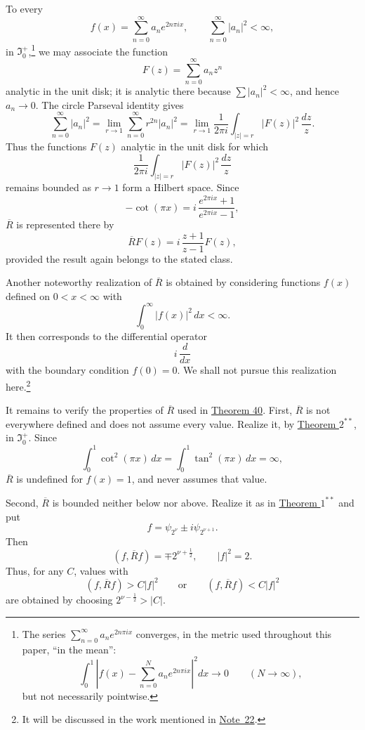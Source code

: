 ﻿\documentclass[paper=b5,fontsize=13pt,bookmarkpackage=false,twoside]{scrartcl}
\newcounter{translatornote}
\begin{document}
To every
\[
  f(x)=\sum_{n=0}^{\infty}a_ne^{2n\pi ix},
  \qquad
  \sum_{n=0}^{\infty}|a_n|^2<\infty,
\]
in \(\mathfrak I_0^+\),\footnote{\label{fn:78}The series
\(\sum_{n=0}^{\infty}a_ne^{2n\pi ix}\) converges, in the metric used
throughout this paper, ``in the mean'':
\[
  \int_0^1\left|
  f(x)-\sum_{n=0}^{N}a_ne^{2n\pi ix}
  \right|^2dx\longrightarrow0
  \qquad(N\to\infty),
\]
but not necessarily pointwise.}
we may associate the function
\[
  F(z)=\sum_{n=0}^{\infty}a_nz^n
\]
analytic in the unit disk; it is analytic there because
\(\sum|a_n|^2<\infty\), and hence \(a_n\to0\).  The circle Parseval
identity gives
\[
 \sum_{n=0}^{\infty}|a_n|^2
 =\lim_{r\to1}\sum_{n=0}^{\infty}r^{2n}|a_n|^2
 =\lim_{r\to1}\frac{1}{2\pi i}
   \int_{|z|=r}|F(z)|^2\,\frac{dz}{z}.
\]
Thus the functions \(F(z)\) analytic in the unit disk for which
\[
  \frac{1}{2\pi i}\int_{|z|=r}|F(z)|^2\,\frac{dz}{z}
\]
remains bounded as \(r\to1\) form a Hilbert space.  Since
\[
  -\cot(\pi x)
  =i\,\frac{e^{2\pi ix}+1}{e^{2\pi ix}-1},
\]
\(\overline R\) is represented there by
\[
  \overline RF(z)=i\,\frac{z+1}{z-1}F(z),
\]
provided the result again belongs to the stated class.

Another noteworthy realization of \(\overline R\) is obtained by
considering functions \(f(x)\) defined on \(0<x<\infty\) with
\[
  \int_0^\infty|f(x)|^2\,dx<\infty.
\]
It then corresponds to the differential operator
\[
  i\,\frac{d}{dx}
\]
with the boundary condition \(f(0)=0\).  We shall not pursue this
realization here.\footnote{\label{fn:79}It will be discussed in the work mentioned
in \hyperref[fn:source-22]{Note~22}.}

It remains to verify the properties of \(\overline R\) used in
\hyperref[thm:40]{Theorem 40}.  First,
\(\overline R\) is not everywhere defined and does not assume every
value.  Realize it, by \hyperref[thm:appIV-2]{Theorem \(2^{**}\)}, in
\(\mathfrak I_0^+\).  Since
\[
  \int_0^1\cot^2(\pi x)\,dx
  =\int_0^1\tan^2(\pi x)\,dx
  =\infty,
\]
\(\overline R\) is undefined for \(f(x)=1\), and never assumes that
value.

Second, \(\overline R\) is bounded neither below nor above.  Realize it
as in \hyperref[thm:appIV-1]{Theorem \(1^{**}\)} and put
\[
  f=\psi_{2^\nu}\pm i\psi_{2^{\nu+1}}.
\]
Then
\[
  (f,\overline Rf)=\mp2^{\nu+\frac12},
  \qquad |f|^2=2.
\]
Thus, for any \(C\), values with
\[
  (f,\overline Rf)>C|f|^2
  \qquad\text{or}\qquad
  (f,\overline Rf)<C|f|^2
\]
are obtained by choosing \(2^{\nu-\frac12}>|C|\).
\end{document}
